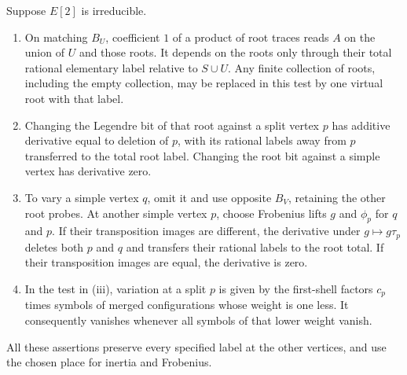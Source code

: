 \begin{proposition}
\label{tc:irreducible-rules}
Suppose $E[2]$ is irreducible.
\begin{enumerate}[label=\textup{(\roman*)}]
\item On matching $B_U$, coefficient $1$ of a product of root
traces reads $A$ on the union of $U$ and those roots.  It depends
on the roots only through their total rational elementary label
relative to $S\cup U$.  Any finite collection of roots, including
the empty collection, may be replaced in this test by one virtual
root with that label.
\item Changing the Legendre bit of that root against a split
vertex $p$ has additive derivative equal to deletion of $p$,
with its rational labels away from $p$ transferred to the total
root label.  Changing the root bit against a simple vertex has
derivative zero.
\item To vary a simple vertex $q$, omit it and use opposite
$B_V$, retaining the other root probes.  At another simple
vertex $p$, choose Frobenius lifts $g$ and $\phi_p$ for $q$ and
$p$.  If their transposition images are different, the derivative
under $g\mapsto g\tau_p$ deletes both $p$ and $q$ and transfers
their rational labels to the root total.  If their transposition
images are equal, the derivative is zero.
\item In the test in (iii), variation at a split $p$ is given by
the first-shell factors $c_p$ times symbols of merged
configurations whose weight is one less.  It consequently
vanishes whenever all symbols of that lower weight vanish.
\end{enumerate}
All these assertions preserve every specified label at the other
vertices, and use the chosen place for inertia and Frobenius.
\end{proposition}

